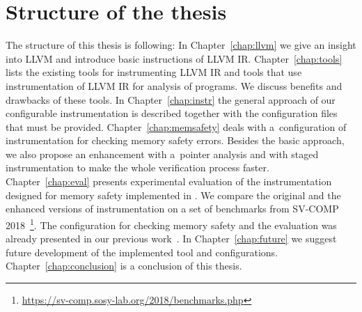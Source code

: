 \section{Structure of the thesis}

The structure of this thesis is following: In Chapter~\ref{chap:llvm} we give
an insight into LLVM and introduce basic instructions of LLVM IR.
Chapter~\ref{chap:tools} lists the existing tools for instrumenting LLVM IR and
tools that use instrumentation of LLVM IR for analysis of programs. We discuss
benefits and drawbacks of these tools. In Chapter~\ref{chap:instr} the general
approach of our configurable instrumentation is described together with the
configuration files that must be provided. Chapter~\ref{chap:memsafety} deals
with a~configuration of instrumentation for checking memory safety errors.
Besides the basic approach, we also propose an enhancement with a~pointer
analysis and with staged instrumentation to make the whole verification process
faster. Chapter~\ref{chap:eval} presents experimental evaluation of the
instrumentation designed for memory safety implemented in \symbiotic. We
compare the original and the enhanced versions of instrumentation on a set of
benchmarks from SV-COMP
2018~\footnote{\url{https://sv-comp.sosy-lab.org/2018/benchmarks.php}}. The
configuration for checking memory safety and the evaluation was already
presented in our previous work~\cite{tacas2018}. In
Chapter~\ref{chap:future} we suggest future development of the implemented tool
and configurations. Chapter~\ref{chap:conclusion} is a conclusion of this
thesis.
